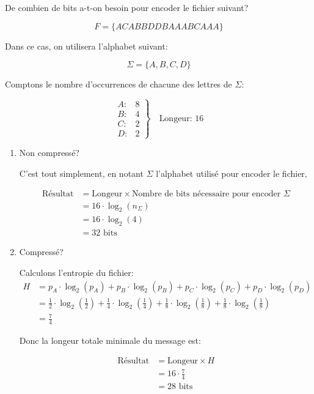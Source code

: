 \documentclass[a4paper,11pt]{article}
\newcommand{\ti}{\cdot}
\begin{document}
De combien de bits a-t-on besoin pour encoder le fichier suivant?

$$ F = \{ACABBDDBAAABCAAA\} $$

Dans ce cas, on utilisera l'alphabet suivant:

$$ \Sigma = \{A, B, C, D \} $$

Comptons le nombre d'occurrences de chacune des lettres de $ \Sigma $:

\[\left.
  \begin{array}{lr}
    A: & 8 \\
    B: & 4 \\
    C: & 2 \\
    D: & 2
  \end{array}
\right\} \quad \text{Longeur: 16}
\]


\begin{enumerate}

\item Non compressé?

  C'est tout simplement, en notant $\Sigma$ l'alphabet utilisé pour encoder le
  fichier,

  \begin{align*}
    \text{Résultat} &= \text{Longeur} \times \text{Nombre de bits nécessaire
                      pour encoder } \Sigma \\
                    &= 16 \ti \log_2(n_{\Sigma}) \\
                    &= 16 \ti \log_2(4) \\
                    &= 32 \text{ bits}
  \end{align*}

\item Compressé?

  Calculons l'entropie du fichier:
  \begin{align*}
    H &= p_A \ti \log_2(p_A) + p_B \ti \log_2(p_B) + p_C \ti \log_2(p_C) + p_D \ti \log_2(p_D) \\
      &= \frac{1}{2} \ti \log_2\left(\frac{1}{2}\right) + \frac{1}{4} \ti \log_2\left(\frac{1}{4}\right) +
        \frac{1}{8} \ti \log_2\left(\frac{1}{8}\right) + \frac{1}{8} \ti \log_2\left(\frac{1}{8}\right) \\
      &= \frac{7}{4}
  \end{align*}

  Donc la longeur totale minimale du message est:

  \begin{align*}
    \text{Résultat} &= \text{Longeur} \times H \\
                    &= 16 \ti \frac{7}{4} \\
                    &= 28 \text{ bits}
  \end{align*}

\end{enumerate}
\end{document}
